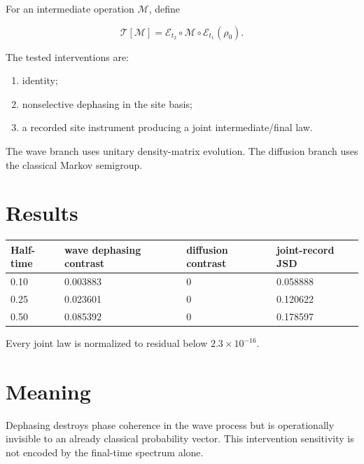 \documentclass[11pt,a4paper,openany]{report}
\begin{document}
For an intermediate operation \(\mathcal M\), define

\[
\mathcal T[\mathcal M]
=
\mathcal E_{t_2}
\circ
\mathcal M
\circ
\mathcal E_{t_1}(\rho_0).
\]

The tested interventions are:

\begin{enumerate}
\item 
identity;

\item 
nonselective dephasing in the site basis;

\item 
a recorded site instrument producing a joint intermediate/\allowbreak{}final law.

\end{enumerate}

The wave branch uses unitary density-matrix evolution. The diffusion branch uses the classical Markov semigroup.

\section{Results}

\begin{center}
\begingroup\small
\setlength{\tabcolsep}{3.5pt}
\renewcommand{\arraystretch}{1.16}
\begin{longtable}{@{}p{}p{}p{}p{}@{}}
\toprule
\textbf{Half-time} & \textbf{wave dephasing contrast} & \textbf{diffusion contrast} & \textbf{joint-record JSD} \\
\midrule
\endhead
0.10 & 0.003883 & 0 & 0.058888 \\
0.25 & 0.023601 & 0 & 0.120622 \\
0.50 & 0.085392 & 0 & 0.178597 \\
\bottomrule
\end{longtable}
\endgroup
\end{center}

Every joint law is normalized to residual below \(2.3\times10^{-16}\).

\section{Meaning}

Dephasing destroys phase coherence in the wave process but is operationally invisible to an already classical probability vector. This intervention sensitivity is not encoded by the final-time spectrum alone.
\end{document}
